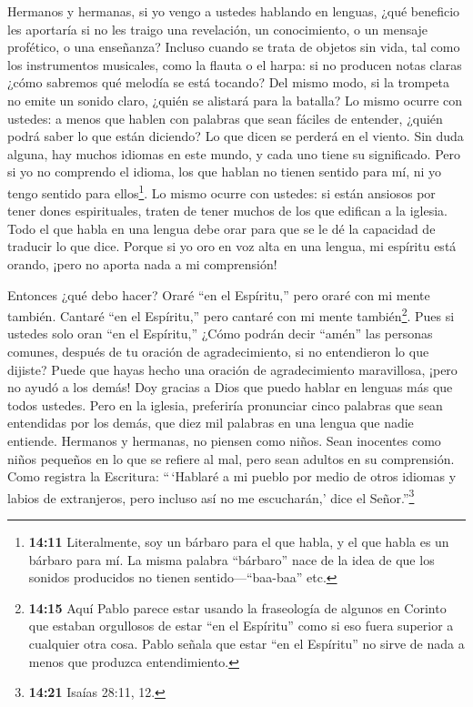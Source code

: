  Hermanos y hermanas, si yo vengo a ustedes hablando en
lenguas, ¿qué beneficio les aportaría si no les traigo una revelación,
un conocimiento, o un mensaje profético, o una enseñanza? 
Incluso cuando se trata de objetos sin vida, tal como los instrumentos
musicales, como la flauta o el harpa: si no producen notas claras ¿cómo
sabremos qué melodía se está tocando?  Del mismo modo, si la
trompeta no emite un sonido claro, ¿quién se alistará para la batalla?
 Lo mismo ocurre con ustedes: a menos que hablen con
palabras que sean fáciles de entender, ¿quién podrá saber lo que están
diciendo? Lo que dicen se perderá en el viento.  Sin duda
alguna, hay muchos idiomas en este mundo, y cada uno tiene su
significado.  Pero si yo no comprendo el idioma, los que
hablan no tienen sentido para mí, ni yo tengo sentido para
ellos\footnote{\textbf{14:11} Literalmente, soy un bárbaro para el que
  habla, y el que habla es un bárbaro para mí. La misma palabra
  ``bárbaro'' nace de la idea de que los sonidos producidos no tienen
  sentido---``baa-baa'' etc.}.  Lo mismo ocurre con
ustedes: si están ansiosos por tener dones espirituales, traten de tener
muchos de los que edifican a la iglesia.  Todo el que habla
en una lengua debe orar para que se le dé la capacidad de traducir lo
que dice.  Porque si yo oro en voz alta en una lengua, mi
espíritu está orando, ¡pero no aporta nada a mi comprensión!

 Entonces ¿qué debo hacer? Oraré ``en el Espíritu,'' pero
oraré con mi mente también. Cantaré ``en el Espíritu,'' pero cantaré con
mi mente también\footnote{\textbf{14:15} Aquí Pablo parece estar usando
  la fraseología de algunos en Corinto que estaban orgullosos de estar
  ``en el Espíritu'' como si eso fuera superior a cualquier otra cosa.
  Pablo señala que estar ``en el Espíritu'' no sirve de nada a menos que
  produzca entendimiento.}.  Pues si ustedes solo oran ``en
el Espíritu,'' ¿Cómo podrán decir ``amén'' las personas comunes, después
de tu oración de agradecimiento, si no entendieron lo que dijiste?
 Puede que hayas hecho una oración de agradecimiento
maravillosa, ¡pero no ayudó a los demás!  Doy gracias a
Dios que puedo hablar en lenguas más que todos ustedes. 
Pero en la iglesia, preferiría pronunciar cinco palabras que sean
entendidas por los demás, que diez mil palabras en una lengua que nadie
entiende.  Hermanos y hermanas, no piensen como niños. Sean
inocentes como niños pequeños en lo que se refiere al mal, pero sean
adultos en su comprensión.  Como registra la Escritura:
``\,`Hablaré a mi pueblo por medio de otros idiomas y labios de
extranjeros, pero incluso así no me escucharán,' dice el
Señor.''\footnote{\textbf{14:21} Isaías 28:11, 12.}

